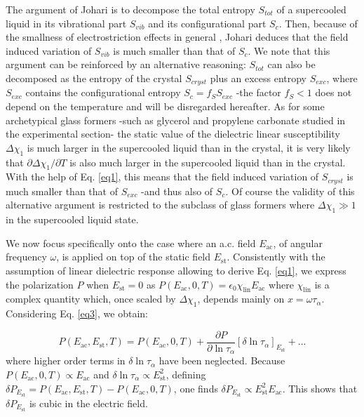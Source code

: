 \documentclass[single column,pre]{revtex4}
\begin{document}
The argument of Johari is to decompose the total entropy $S_{tot}$ of a supercooled liquid in its vibrational part $S_{vib}$ and its configurational part $S_c$. Then, because of the smallness of electrostriction effects in general \cite{Joh13,Joh16}, Johari deduces that the field induced variation of $S_ {vib}$ is much smaller than that of $S_c$. We note that this argument can be reinforced by an alternative reasoning: $S_{tot}$ can also be decomposed as the entropy of the crystal $S_{cryst}$ plus an excess entropy $S_{exc}$, where $S_{exc}$ contains the configurational entropy $S_{c}= f_S S_{exc}$ -the factor $f_S<1$ does not depend on the temperature \cite{Sam16} and will be disregarded hereafter. As for some archetypical glass formers -such as glycerol and propylene carbonate studied in the experimental section- the static value of the dielectric linear susceptibility $\Delta \chi_1$ is much larger in the supercooled liquid than in the crystal, it is very likely that $\partial \Delta \chi_1/{\partial T}$ is also much larger in the supercooled liquid than in the crystal. With the help of Eq. \ref{eq1}, this means that the field induced variation of $S_{cryst}$ is much smaller than that of $S_{exc}$ -and thus also of $S_{c}$. Of course the validity of this alternative argument is restricted to the subclass of glass formers where $\Delta \chi_1 \gg 1$ in the supercooled liquid state.

We now focus specifically onto the case where an a.c. field $E_{\text{ac}}$, of angular frequency $\omega$, is applied on top of the static field $E_{\text{st}}$. Consistently with the assumption of 
linear dielectric response allowing to derive Eq. \ref{eq1}, we express the polarization $P$ when $E_{\text{st}}=0$ as  $P(E_{\text{ac}},0,T) = \epsilon_0 \chi_{\text{lin}} E_{\text{ac}}$ where $\chi_{\text{lin}}$ is a complex 
quantity which, once scaled by $\Delta \chi_1$, depends mainly on $x = \omega \tau_{\alpha}$. Considering Eq. \ref{eq3}, we obtain:

\begin{equation}
P(E_{\text{ac}}, E_{\text{st}}, T) = P(E_{\text{ac}}, 0, T) + \frac{\partial P}{\partial \ln{\tau_{\alpha}}} \left[ \delta \ln{\tau_{\alpha}} \right]_{E_{\text{st}}} +...
\label{eq4}
\end{equation}
where higher order terms in $\delta \ln{\tau_{\alpha}}$ have been neglected. Because $P(E_{\text{ac}},0,T) \propto E_{\text{ac}}$ and $\delta \ln{\tau_{\alpha}} \propto E_{\text{st}}^2$, defining $\delta P_{E_{\text{st}}}  = P(E_{\text{ac}}, E_{\text{st}}, T) - P(E_{\text{ac}}, 0, T)$, one finds $\delta P_{E_{\text{st}}} \propto E_{\text{st}}^2E_{\text{ac}}$. This shows that $\delta P_{E_{\text{st}}}$ is cubic in the electric field. 
\end{document}
